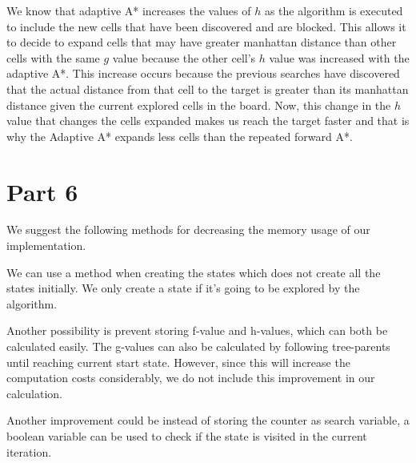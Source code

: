 \documentclass{article}
\begin{document}
We know that adaptive A* increases the values of $h$ as the algorithm is executed to include the new cells that have been discovered and are blocked. This allows it to decide to expand cells that may have greater manhattan distance than other cells with the same $g$ value because the other cell's $h$ value was increased with the adaptive A*. This increase occurs because the previous searches have discovered that the actual distance from that cell to the target is greater than its manhattan distance given the current explored cells in the board. Now, this change in the $h$ value that changes the cells expanded makes us reach the target faster and that is why the Adaptive A* expands less cells than the repeated forward A*.

\section*{Part 6}
We suggest the following methods for decreasing the memory usage of our implementation. 

We can use a method when creating the states which does not  create all the states initially. We only create a state if it's going to be explored by the algorithm.

Another possibility is prevent storing f-value and h-values, which can both be calculated easily. The g-values can also be calculated by following tree-parents until reaching current start state. However, since this will increase the computation costs considerably, we do not include this improvement in our calculation. 

 Another improvement could be instead of storing the counter as search variable, a boolean variable can be used to check if the state is visited in the current iteration.
\end{document}

